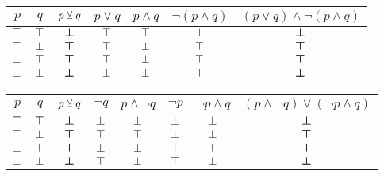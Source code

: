                 \begin{center}
                        \begin{tabular}{cc|ccccc}
                                $p$ & $q$ & $p \mathbin{\veebar} q$ & $p \lor q$ & $p \land q$ & $\lnot(p \land q)$ & $(p \lor q) \land \lnot(p \land q)$  \\
                                \hline
                                $\top$ & $\top$ & $\boldsymbol{\bot}$ & $\top$ & $\top$ & $\bot$ & $\boldsymbol{\bot}$ \\
                                $\top$ & $\bot$ & $\boldsymbol{\top}$ & $\top$ & $\bot$ & $\top$ & $\boldsymbol{\top}$ \\
                                $\bot$ & $\top$ & $\boldsymbol{\top}$ & $\top$ & $\bot$ & $\top$ & $\boldsymbol{\top}$ \\
                                $\bot$ & $\bot$ & $\boldsymbol{\bot}$ & $\bot$ & $\bot$ & $\top$ & $\boldsymbol{\bot}$
                        \end{tabular}
                \end{center}

                \begin{center}
                        \begin{tabular}{cc|cccccc}
                                $p$ & $q$ & $p \mathbin{\veebar} q$ & $\lnot{q}$ & $p \land \lnot{q}$ & $\lnot{p}$ & $\lnot{p} \land q$ & $(p \land \lnot{q}) \lor (\lnot{p} \land q)$  \\
                                \hline
                                $\top$ & $\top$ & $\boldsymbol{\bot}$ & $\bot$ & $\bot$ & $\bot$ & $\bot$ & $\boldsymbol{\bot}$ \\
                                $\top$ & $\bot$ & $\boldsymbol{\top}$ & $\top$ & $\top$ & $\bot$ & $\bot$ & $\boldsymbol{\top}$ \\
                                $\bot$ & $\top$ & $\boldsymbol{\top}$ & $\bot$ & $\bot$ & $\top$ & $\top$ & $\boldsymbol{\top}$ \\
                                $\bot$ & $\bot$ & $\boldsymbol{\bot}$ & $\top$ & $\bot$ & $\top$ & $\bot$ & $\boldsymbol{\bot}$
                        \end{tabular}
                \end{center}

